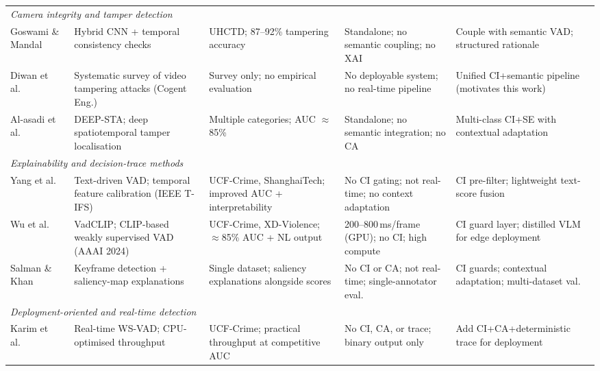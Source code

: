 \documentclass[sensors,article,submit,pdftex,moreauthors]{Definitions/mdpi}
\begin{document}
\begin{table}[H]
\begin{tabularx}{\linewidth}{p{1.8cm} p{3.2cm} p{2.6cm} p{2.6cm} p{2.6cm}}
\multicolumn{5}{l}{\textit{Camera integrity and tamper detection}} \\[1pt]
 
Goswami \& Mandal~\cite{goswami2023hybrid}
  & Hybrid CNN + temporal consistency checks
  & UHCTD; 87--92\% tampering accuracy
  & Standalone; no semantic coupling; no XAI
  & Couple with semantic VAD; structured rationale \\
 
Diwan et al.~\cite{diwan2024systematic}
  & Systematic survey of video tampering attacks (Cogent Eng.)
  & Survey only; no empirical evaluation
  & No deployable system; no real-time pipeline
  & Unified CI+semantic pipeline (motivates this work) \\
 
Al-asadi et al.~\cite{deepsta2024}
  & DEEP-STA; deep spatiotemporal tamper localisation
  & Multiple categories; AUC $\approx$85\%
  & Standalone; no semantic integration; no CA
  & Multi-class CI+SE with contextual adaptation \\[3pt]
 
\multicolumn{5}{l}{\textit{Explainability and decision-trace methods}} \\[1pt]
 
Yang et al.~\cite{yang2024textvad}
  & Text-driven VAD; temporal feature calibration (IEEE T-IFS)
  & UCF-Crime, ShanghaiTech; improved AUC + interpretability
  & No CI gating; not real-time; no context adaptation
  & CI pre-filter; lightweight text-score fusion \\
 
Wu et al.~\cite{wu2024vadclip}
  & VadCLIP; CLIP-based weakly supervised VAD (AAAI 2024)
  & UCF-Crime, XD-Violence; $\approx$85\% AUC + NL output
  & 200--800\,ms/frame (GPU); no CI; high compute
  & CI guard layer; distilled VLM for edge deployment \\
 
Salman \& Khan~\cite{salman2025explainable}
  & Keyframe detection + saliency-map explanations
  & Single dataset; saliency explanations alongside scores
  & No CI or CA; not real-time; single-annotator eval.
  & CI guards; contextual adaptation; multi-dataset val. \\[3pt]
 
\multicolumn{5}{l}{\textit{Deployment-oriented and real-time detection}} \\[1pt]
 
Karim et al.~\cite{karim2024real}
  & Real-time WS-VAD; CPU-optimised throughput
  & UCF-Crime; practical throughput at competitive AUC
  & No CI, CA, or trace; binary output only
  & Add CI+CA+deterministic trace for deployment \\
 

\end{tabularx}
\end{table}
\end{document}
